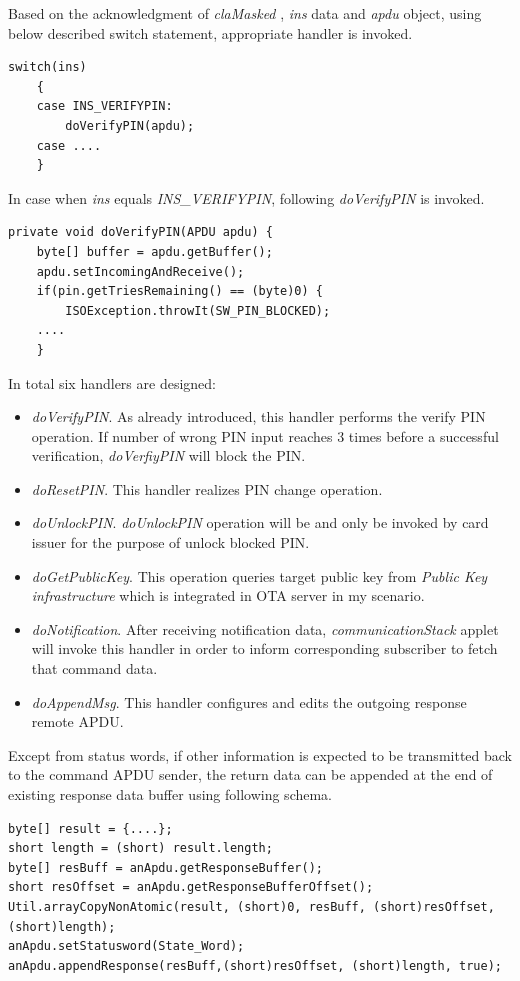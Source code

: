 Based on the acknowledgment of \emph{claMasked} , \emph{ins} data and \emph{apdu} object, using below described switch statement, appropriate handler is invoked.

\begin{Verbatim}[frame=lines,framesep=4mm, label=\fbox{\small\emph{Switch Statement}}]
switch(ins)
	{
	case INS_VERIFYPIN:
		doVerifyPIN(apdu);
	case ....
	}
\end{Verbatim}
In case when \emph{ins} equals \emph{INS\_VERIFYPIN}, following \emph{doVerifyPIN} is invoked.

\begin{Verbatim}[fontsize=\relsize{-1}, frame=lines,framesep=4mm, label=\fbox{\small\emph{doVerifyPIN Handler}}]
private void doVerifyPIN(APDU apdu) {
	byte[] buffer = apdu.getBuffer();
	apdu.setIncomingAndReceive();			
	if(pin.getTriesRemaining() == (byte)0) {
		ISOException.throwIt(SW_PIN_BLOCKED);	
	....
	}
\end{Verbatim}
In total six handlers are designed:
\begin{itemize}
\item \emph{doVerifyPIN}. As already introduced, this handler performs the verify PIN operation. If number of wrong PIN input reaches 3 times before a successful verification, \emph{doVerfiyPIN} will block the PIN.
\item \emph{doResetPIN}. This handler realizes PIN change operation.
\item \emph{doUnlockPIN}. \emph{doUnlockPIN} operation will be and only be invoked by card issuer for the purpose of unlock blocked PIN.
\item \emph{doGetPublicKey}. This operation queries target public key from \emph{Public Key infrastructure} which is integrated in OTA server in my scenario.
\item \emph{doNotification}. After receiving notification data, \emph{communicationStack} applet will invoke this handler in order to inform corresponding subscriber to fetch that command data. 
\item \emph{doAppendMsg}. This handler configures and edits the outgoing response remote APDU.
\end{itemize}

Except from status words, if other information is expected to be transmitted back to the command APDU sender,  the return data can be appended at the end of existing response data buffer using following schema.

\begin{Verbatim}[fontsize=\relsize{-2.0}, frame=lines,framesep=4mm, label=\fbox{\small\emph{Editing Response Data}}]
byte[] result = {....};
short length = (short) result.length;
byte[] resBuff = anApdu.getResponseBuffer(); 
short resOffset = anApdu.getResponseBufferOffset();
Util.arrayCopyNonAtomic(result, (short)0, resBuff, (short)resOffset, (short)length);	    
anApdu.setStatusword(State_Word);
anApdu.appendResponse(resBuff,(short)resOffset, (short)length, true);
\end{Verbatim}

